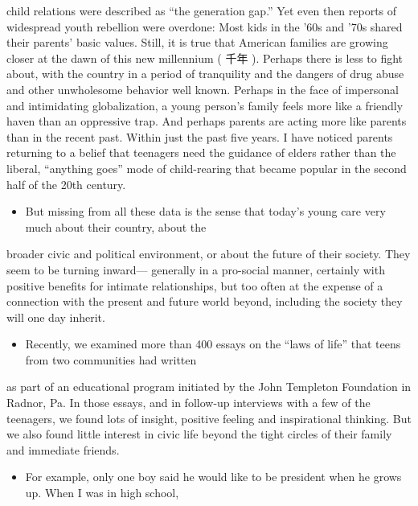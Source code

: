 \documentclass[UTF8,11pt]{ctexart}
\begin{document}
child relations were described as “the generation gap.” Yet even then reports of widespread youth rebellion were overdone: Most kids in the ’60s and ’70s shared their parents’ basic values. Still, it is true that American families are growing closer at the dawn of this new millennium ( 千年 ). Perhaps there is less to fight about, with the country in a period of tranquility and the dangers of drug abuse and other unwholesome behavior well known. Perhaps in the face of impersonal and intimidating globalization, a young person’s family feels more like a friendly haven than an oppressive trap. And perhaps parents are acting more like parents than in the recent past. Within just the past five years. I have noticed parents returning to a belief that teenagers need the guidance of elders rather than the liberal, “anything goes” mode of child-rearing that became popular in the second half of the 20th century.


\begin{itemize}[leftmargin=2em,itemsep=.2em,topsep=.4em]\item[G.] But missing from all these data is the sense that today’s young care very much about their country, about the
\end{itemize}

broader civic and political environment, or about the future of their society. They seem to be turning inward— generally in a pro-social manner, certainly with positive benefits for intimate relationships, but too often at the expense of a connection with the present and future world beyond, including the society they will one day inherit.


\begin{itemize}[leftmargin=2em,itemsep=.2em,topsep=.4em]\item[H.] Recently, we examined more than 400 essays on the “laws of life” that teens from two communities had written
\end{itemize}

as part of an educational program initiated by the John Templeton Foundation in Radnor, Pa. In those essays, and in follow-up interviews with a few of the teenagers, we found lots of insight, positive feeling and inspirational thinking. But we also found little interest in civic life beyond the tight circles of their family and immediate friends.


\begin{itemize}[leftmargin=2em,itemsep=.2em,topsep=.4em]\item[I.] For example, only one boy said he would like to be president when he grows up. When I was in high school,
\end{itemize}
\end{document}
